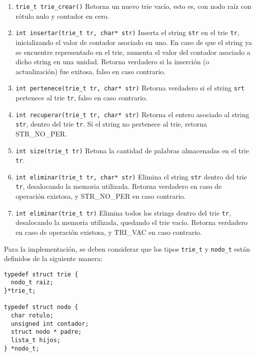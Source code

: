 \documentclass[12pt,a4paper]{article}
\begin{document}
\begin{enumerate}
	
	\item \texttt{trie\_t trie\_crear()} Retorna un nuevo trie vacío, esto es, con nodo raíz con rótulo nulo y contador en cero.
	
	\item \texttt{int insertar(trie\_t tr, char* str)} Inserta el string \texttt{str} en el trie \texttt{tr}, inicializando el valor de contador asociado en uno. En caso de que el string ya se encuentre representado en el trie, aumenta el valor del contador asociado a dicho string en una unidad. Retorna verdadero si la inserción (o actualización) fue exitosa, falso en caso contrario.

	\item \texttt{int pertenece(trie\_t tr, char* str)} Retorna verdadero si el string \texttt{srt} pertenece al trie \texttt{tr}, falso en caso contrario.
	
	\item \texttt{int recuperar(trie\_t tr, char* str)} Retorna el entero asociado al string \texttt{str}, dentro del trie \texttt{tr}. Si el string no pertenece al trie, retorna STR\_NO\_PER.

	\item \texttt{int size(trie\_t tr)} Retona la cantidad de palabras almacenadas en el trie \texttt{tr}.
	
	\item \texttt{int eliminar(trie\_t tr, char* str)} Elimina el string \texttt{str} dentro del trie \texttt{tr}, desalocando la memoria utilizada. Retorna verdadero en caso de operación existosa, y STR\_NO\_PER en caso contrario.
		
	\item \texttt{int eliminar(trie\_t tr)} Elimina todos los strings dentro del trie \texttt{tr}, desalocando la memoria utilizada, quedando el trie vacío. Retorna verdadero en caso de operación existosa, y TRI\_VAC en caso contrario.
	
\end{enumerate}

Para la implementación, se deben considerar que los tipos \texttt{trie\_t} y \texttt{nodo\_t} están definidos de la siguiente manera:

\begin{verbatim}
typedef struct trie {
  nodo_t raiz;
}*trie_t;

typedef struct nodo {
  char rotulo;
  unsigned int contador;
  struct nodo * padre;
  lista_t hijos;
} *nodo_t;

\end{verbatim}
\end{document}
